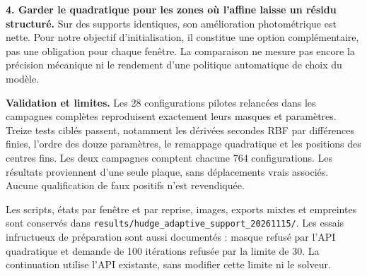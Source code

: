 \documentclass[11pt,a4paper,landscape]{article}
\begin{document}
\textbf{4. Garder le quadratique pour les zones où l'affine laisse un résidu structuré.}
Sur des supports identiques, son amélioration photométrique est nette. Pour notre
objectif d'initialisation, il constitue une option complémentaire, pas une obligation
pour chaque fenêtre. La comparaison ne mesure pas encore la précision mécanique ni
le rendement d'une politique automatique de choix du modèle.

\textbf{Validation et limites.} Les 28 configurations pilotes relancées dans les campagnes
complètes reproduisent exactement leurs masques et paramètres. Treize tests ciblés
passent, notamment les dérivées secondes RBF par différences finies, l'ordre des douze
paramètres, le remappage quadratique et les positions des centres fins. Les deux campagnes
comptent chacune 764 configurations. Les résultats proviennent d'une seule plaque,
sans déplacements vrais associés. Aucune qualification de faux positifs n'est revendiquée.

Les scripts, états par fenêtre et par reprise, images, exports mixtes et empreintes
sont conservés dans \texttt{results/hudge\_adaptive\_support\_20261115/}.
Les essais infructueux de préparation sont aussi documentés : masque refusé par
l'API quadratique et demande de 100 itérations refusée par la limite de 30. La
continuation utilise l'API existante, sans modifier cette limite ni le solveur.
\end{document}
